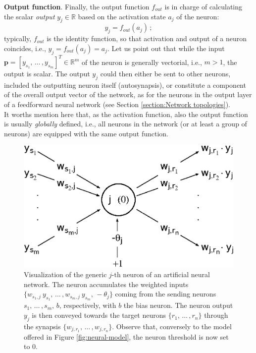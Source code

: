 \documentclass[12pt, a4paper, twoside, openright]{report}
\numberwithin{equation}{chapter}
\theoremstyle{theorem}
\theoremstyle{definition}
\theoremstyle{remark}
\theoremstyle{proposition}
\numberwithin{figure}{chapter}
\begin{document}
		\noindent \textbf{Output function}. Finally, the output function $f_{out}$ is in charge of calculating the scalar \emph{output} $y_j \in \mathbb{R}$ based on the activation state $a_j$ of the neuron:
		\begin{equation}
			\label{eq:output-function}
			y_j = f_{out}(a_j) \, ;
		\end{equation} 
		typically, $f_{out}$ is the identity function, so that activation and output of a neuron coincides, i.e., $y_j = f_{out}(a_j) = a_j$. Let us point out that while the input $\mathbf{p} = [y_{s_1}, \, \ldots \, , y_{s_m}]^T \in \mathbb{R}^m$ of the neuron is generally vectorial, i.e., $m > 1$, the output is scalar. The output $y_j$ could then either be sent to other neurons, included the outputting neuron itself (autosynapsis), or constitute a component of the overall output vector of the network, as for the neurons in the output layer of a feedforward neural network (see Section \ref{section:Network topologies}). \\
		It worths mention here that, as the activation function, also the output function is usually \emph{globally} defined, i.e., all neurons in the network (or at least a group of neurons) are equipped with the same output function.
		
		\begin{figure}[t]
			\center
			\includegraphics[scale = 0.6]{neural_model_bias.eps}
			
			\caption{Visualization of the generic $j$-th neuron of an artificial neural network. The neuron accumulates the weighted inputs $\big\lbrace w_{s_1,j} ~ y_{s_1}, \, \ldots \, , w_{s_m,j} ~ y_{s_m}, \, -\theta_j \big\rbrace$ coming from the sending neurons $s_1, \, \ldots \, , s_m, \, b$, respectively, with $b$ the bias neuron. The neuron output $y_j$ is then conveyed towards the target neurons $\big\lbrace r_1, \, \ldots \, , r_n \big\rbrace$ through the synapsis $\big\lbrace w_{j,r_1}, \, \ldots \, , w_{j,r_n} \big\rbrace$. Observe that, conversely to the model offered in Figure \ref{fig:neural-model}, the neuron threshold is now set to $0$.} 
			\label{fig:neural-model-bias}
		\end{figure}
		
\end{document}
